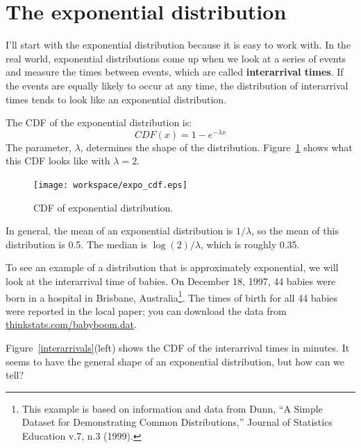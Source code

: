 \documentclass[12pt]{book}
\begin{document}
\section{The exponential distribution}

I'll start with the exponential distribution because it is
easy to work with.  In the real world, exponential distributions
come up when we look at a series of events and measure the
times between events, which are called {\bf interarrival times}.
If the events are equally likely to occur at any time, the distribution
of interarrival times tends to look like an exponential distribution.


The CDF of the exponential distribution is:
%
\[ CDF(x) = 1 - e^{-\lambda x} \]
%
The parameter, $\lambda$, determines the shape of the
distribution.  Figure~\ref{expo_cdf} shows what this CDF looks like with
$\lambda = 2$.



\begin{figure}
\centerline{\texttt{[image: workspace/expo\_cdf.eps]}}
\caption{CDF of exponential distribution.}
\label{expo_cdf}
\end{figure}

In general, the mean of an exponential distribution is $1 / \lambda$,
so the mean of this distribution is 0.5.  The median is $\log(2) / \lambda$,
which is roughly 0.35.


To see an example of a distribution that is approximately exponential,
we will look at the interarrival time of babies.
On December 18, 1997, 44 babies were born in a hospital in Brisbane,
Australia\footnote{This example is based on information and data from
  Dunn, ``A Simple Dataset for Demonstrating Common Distributions,''
  Journal of Statistics Education v.7, n.3 (1999).}.  The times of
birth for all 44 babies were reported in the local paper; you can
download the data from \url{thinkstats.com/babyboom.dat}.


Figure~\ref{interarrivals}(left) shows the CDF of the interarrival times
in minutes.  It seems to have the general shape of an exponential
distribution, but how can we tell?

\end{document}
